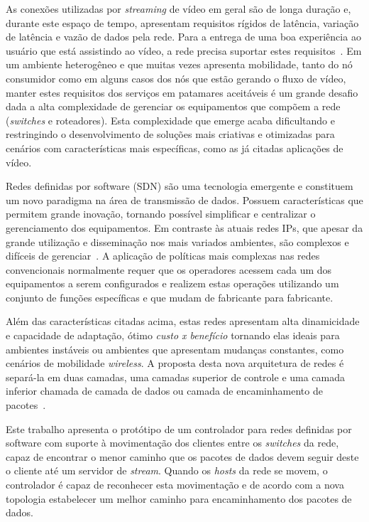 \documentclass[12pt]{article}
\begin{document}
As conexões utilizadas por \emph{streaming} de vídeo em geral são 
de longa duração e, durante este espaço de tempo, apresentam 
requisitos rígidos de latência, variação de latência e vazão de 
dados pela rede. Para a entrega de uma boa experiência ao usuário 
que está assistindo ao vídeo, a rede precisa suportar estes 
requisitos~\cite{narayanan2014}. Em um ambiente heterogêneo e que 
muitas vezes apresenta mobilidade, tanto do nó consumidor como em 
alguns casos dos nós que estão gerando o fluxo de vídeo, manter estes requisitos dos serviços em patamares aceitáveis é um grande desafio dada a alta complexidade de gerenciar os equipamentos que compõem a rede (\emph{switches} e roteadores). Esta complexidade que emerge acaba dificultando e restringindo o desenvolvimento de soluções mais criativas e otimizadas para cenários com características mais específicas, como as já citadas aplicações de vídeo.

Redes definidas por software (SDN) são uma tecnologia emergente e constituem um novo paradigma na área de transmissão de dados. Possuem características que permitem grande inovação, tornando possível simplificar e centralizar o gerenciamento dos equipamentos. Em contraste às atuais redes IPs, que apesar da grande utilização e disseminação nos mais variados ambientes, são complexos e difíceis de gerenciar~\cite{Kreutz2015}. A aplicação de políticas mais complexas nas redes convencionais normalmente requer que os operadores acessem cada um dos equipamentos a serem configurados e realizem estas operações utilizando um conjunto de funções específicas e que mudam de fabricante para fabricante.

Além das características citadas acima, estas redes apresentam alta dinamicidade e capacidade de adaptação, ótimo \emph{custo x benefício} tornando elas ideais para ambientes instáveis ou ambientes que apresentam mudanças constantes, como cenários de mobilidade \emph{wireless}. A proposta desta nova arquitetura de redes é separá-la em duas camadas, uma camadas superior de controle e uma camada inferior chamada de camada de dados ou camada de encaminhamento de pacotes~\cite{Jammal2014}.

Este trabalho apresenta o protótipo de um controlador para redes definidas por software com suporte à movimentação dos clientes entre os \emph{switches} da rede, capaz de encontrar o menor caminho que os pacotes de dados devem seguir deste o cliente até um servidor de \emph{stream}. Quando os \emph{hosts} da rede se movem, o controlador é capaz de reconhecer esta movimentação e de acordo com a nova topologia estabelecer um melhor caminho para encaminhamento dos pacotes de dados.
\end{document}
